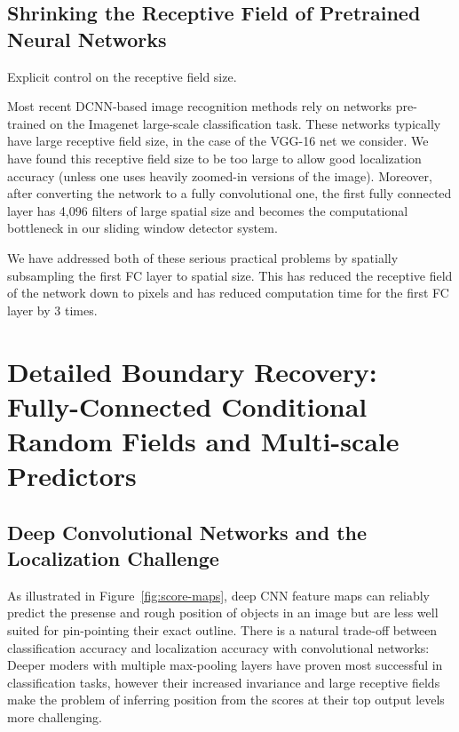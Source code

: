 \subsection{Shrinking the Receptive Field of Pretrained Neural Networks}
\label{sec:convnet-field}

Explicit control on the receptive field size.

Most recent DCNN-based image recognition methods rely on networks pre-trained
on the Imagenet large-scale classification task. These networks typically have
large receptive field size,  in the case of the VGG-16 net we
consider. We have found this receptive field size to be too large to allow
good localization accuracy (unless one uses heavily zoomed-in versions of the
image). Moreover, after converting the network to a fully convolutional one,
the first fully connected layer has 4,096 filters of large  spatial
size and becomes the computational bottleneck in our sliding window detector
system.

We have addressed both of these serious practical problems by spatially
subsampling the first FC layer to  spatial size. This has reduced the
receptive field of the network down to  pixels and has reduced
computation time for the first FC layer by 3 times.


\section{Detailed Boundary Recovery: Fully-Connected Conditional Random Fields
  and Multi-scale Predictors}
\label{sec:boundary-recovery}

\subsection{Deep Convolutional Networks and the Localization Challenge}
\label{sec:local-chal}

As illustrated in Figure~\ref{fig:score-maps}, deep CNN feature maps can
reliably predict the presense and rough position of objects in an image but
are less well suited for pin-pointing their exact outline. There is a natural
trade-off between classification accuracy and localization accuracy with
convolutional networks: Deeper moders with multiple max-pooling layers have
proven most successful in classification tasks, however their increased
invariance and large receptive fields make the problem of inferring position
from the scores at their top output levels more challenging.

